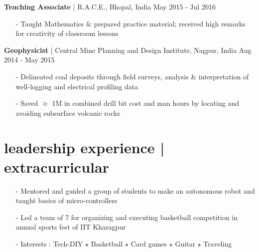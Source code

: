 \documentclass[a4paper, 10pt, oneside]{article}
\newcommand{\bulltetspace}{\vspace{-0.2em}}
\begin{document}
\begin{center}
\color{headings}\textbf{Teaching Associate} | R.A.C.E., Bhopal, India \hfill May 2015 - Jul 2016
\color{text1}
\vspace{-0.3em}
\begin{itemize}
\bulltetspace
\item[-] Taught Mathematics \& prepared practice material; received high remarks for creativity of classroom lessons\\
\end{itemize}

\color{headings}\textbf{Geophysicist} | Central Mine Planning and Design Institute, Nagpur, India \hfill Aug 2014 - May 2015
\color{text1}
\vspace{-0.3em}
\begin{itemize}
\bulltetspace
\item[-] Delineated coal deposits through field surveys, analysis \& interpretation of well-logging and electrical profiling data\\ 
\bulltetspace
\item[-] Saved $\approx$ \faInr 1M in combined drill bit cost and man hours by locating and avoiding subsurface volcanic rocks\\
\bulltetspace
\end{itemize}

\end{center}

\vspace{-0.5em}
\section{\color{headings}leadership experience | extracurricular}
\color{text1}
\begin{center}
\begin{itemize}
\bulltetspace
\item[-] Mentored and guided a group of students to make an autonomous robot and taught basics of micro-controllers\\
\bulltetspace
\item[-] Led a team of 7 for organizing and executing basketball competition in annual sports fest of IIT Kharagpur\\
\bulltetspace
\item[-] Interests :  Tech-DIY $\star$ Basketball $\star$ Card games $\star$ Guitar $\star$ Traveling 

\bulltetspace
\end{itemize}
\end{center}
\vspace{-1em}
\end{document}
